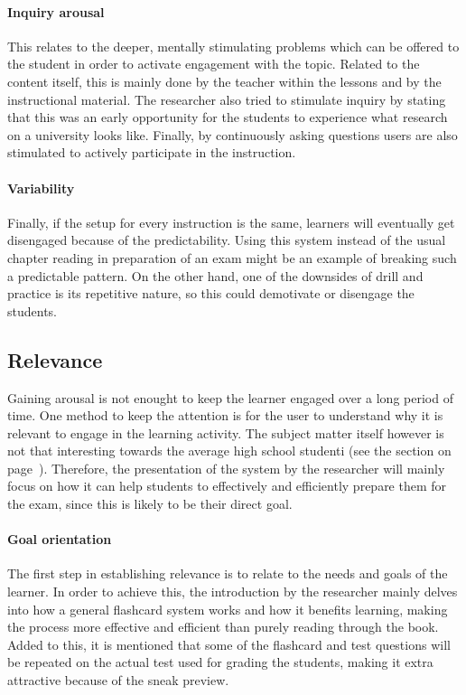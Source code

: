\paragraph{Inquiry arousal} This relates to the deeper, mentally stimulating problems which can be offered to the student in order to activate engagement with the topic. Related to the content itself, this is mainly done by the teacher within the lessons and by the instructional material. The researcher also tried to stimulate inquiry by stating that this was an early opportunity for the students to experience what research on a university looks like. Finally, by continuously asking questions users are also stimulated to actively participate in the instruction.

\paragraph{Variability} Finally, if the setup for every instruction is the same, learners will eventually get disengaged because of the predictability. Using this system instead of the usual chapter reading in preparation of an exam might be an example of breaking such a predictable pattern. On the other hand, one of the downsides of drill and practice is its repetitive nature, so this could demotivate or disengage the students.

        \subsection{Relevance}

Gaining arousal is not enought to keep the learner engaged over a long period of time. One method to keep the attention is for the user to understand why it is relevant to engage in the learning activity. The subject matter itself however is not that interesting towards the average high school studenti (see the  section on page~\pageref{subsec:socialcharacteristics}). Therefore, the presentation of the system by the researcher will mainly focus on how it can help students to effectively and efficiently prepare them for the exam, since this is likely to be their direct goal.

\paragraph{Goal orientation} The first step in establishing relevance is to relate to the needs and goals of the learner. In order to achieve this, the introduction by the researcher mainly delves into how a general flashcard system works and how it benefits learning, making the process more effective and efficient than purely reading through the book. Added to this, it is mentioned that some of the flashcard and test questions will be repeated on the actual test used for grading the students, making it extra attractive because of the sneak preview.

